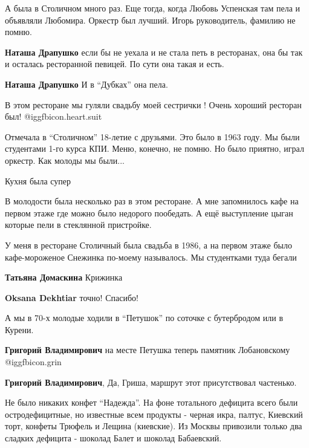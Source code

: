 \begin{itemize}
А была в Столичном много раз. Еще тогда, когда Любовь Успенская там пела и
объявляли Любомира. Оркестр был лучший. Игорь руководитель, фамилию не помню.


\textbf{Наташа Драпушко} если бы не уехала и не стала петь в ресторанах, она бы так и осталась ресторанной певицей. По сути она такая и есть.

\textbf{Наташа Драпушко} И в \enquote{Дубках} она пела.

В этом ресторане мы гуляли свадьбу моей сестрички ! Очень хороший ресторан был! @igg{fbicon.heart.suit}


Отмечала в \enquote{Столичном} 18-летие с друзьями. Это было в 1963 году. Мы были
студентами 1-го курса КПИ. Меню, конечно, не помню. Но было приятно, играл
оркестр. Как молоды мы были...

Кухня была супер


В молодости была несколько раз в этом ресторане. А мне запомнилось кафе на
первом этаже где можно было недорого пообедать. А ещё выступление цыган которые
пели в стеклянной пристройке.


У меня в ресторане Столичный была свадьба в 1986, а на первом этаже было
кафе-мороженое Снежинка по-моему называлось. Мы студентками туда бегали

\begin{itemize} %
\textbf{Татьяна Домаскина} Крижинка

\textbf{Oksana Dekhtiar} точно! Спасибо!
\end{itemize} %


А мы в 70-х молодые ходили в \enquote{Петушок} по соточке с бутербродом или в
Курени.

\begin{itemize} %
\textbf{Григорий Владимирович} на месте Петушка теперь памятник Лобановскому @igg{fbicon.grin} 

\textbf{Григорий Владимирович}, Да, Гриша, маршрут этот присутствовал частенько.
\end{itemize} %


Не было никаких конфет \enquote{Надежда}. На фоне тотального дефицита всего были
остродефицитные, но известные всем продукты - черная икра, палтус, Киевский
торт, конфеты Трюфель и Лещина (киевские). Из Москвы привозили только два
сладких дефицита - шоколад Балет и шоколад Бабаевский.


\end{itemize}
